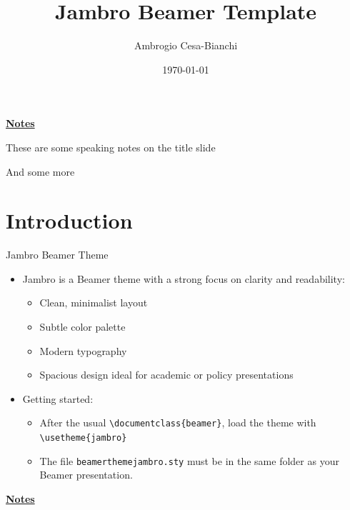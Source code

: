 \documentclass[10pt]{beamer}
\title[]{Jambro Beamer Template}
\author[]{Ambrogio Cesa-Bianchi}
\date{\today}
\begin{document}
\begin{frame}[plain]
\end{frame}
\begin{flushleft}
	\underline{\textbf{Notes}}\setlength{\parskip}{.15cm}\notesize\newline\par
	These are some speaking notes on the title slide \par
	And some more 
\end{flushleft}

\section{Introduction}
\begin{frame}{Jambro Beamer Theme}
    \small
    \begin{itemize}
        \item Jambro is a Beamer theme with a strong focus on clarity and readability:
        \begin{itemize}
            \item Clean, minimalist layout \smallskip
            \item Subtle color palette \smallskip
            \item Modern typography \smallskip
            \item Spacious design ideal for academic or policy presentations \bigskip
        \end{itemize}
        \item Getting started:
        \begin{itemize}
            \item After the usual \texttt{\textbackslash documentclass\{beamer\}}, load the theme with \texttt{\textbackslash usetheme\{jambro\}} \smallskip
            \item The file \texttt{beamerthemejambro.sty} must be in the same folder as your Beamer presentation.
        \end{itemize}
    \end{itemize}
\end{frame}
\begin{flushleft}
	\underline{\textbf{Notes}}\setlength{\parskip}{.15cm}\notesize\newline\par
\end{flushleft}
\end{document}
